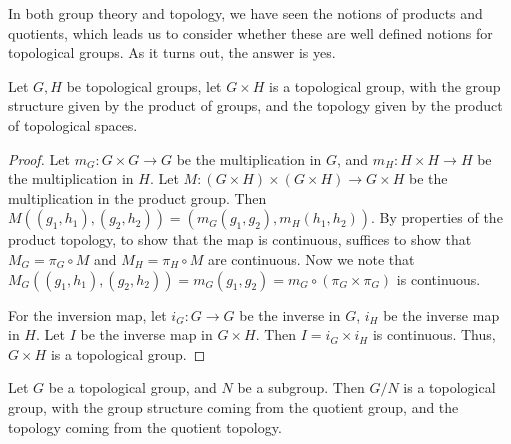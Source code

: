 \documentclass{article}
\begin{document}
    In both group theory and topology, we have seen the notions of products and quotients, which leads us to consider whether these are well defined notions for topological groups. As it turns out, the answer is yes.

    \begin{proposition}
        Let $G, H$ be topological groups, let $G \times H$ is a topological group, with the group structure given by the product of groups, and the topology given by the product of topological spaces.
    \end{proposition}

    \begin{proof}
        Let $m_G : G \times G \to G$ be the multiplication in $G$, and $m_H : H \times H \to H$ be the multiplication in $H$. Let $M : (G \times H) \times (G \times H) \to G \times H$ be the multiplication in the product group. Then $M((g_1, h_1), (g_2, h_2)) = (m_G(g_1, g_2), m_H(h_1, h_2))$. By properties of the product topology, to show that the map is continuous, suffices to show that $M_G = \pi_G \circ M$ and $M_H = \pi_H \circ M$ are continuous. Now we note that $M_G((g_1, h_1), (g_2, h_2)) = m_G(g_1, g_2) = m_G \circ (\pi_G \times \pi_G)$ is continuous.

        For the inversion map, let $i_G : G \to G$ be the inverse in $G$, $i_H$ be the inverse map in $H$. Let $I$ be the inverse map in $G \times H$. Then $I = i_G \times i_H$ is continuous. Thus, $G \times H$ is a topological group.
    \end{proof}

    \begin{proposition}

        Let $G$ be a topological group, and $N$ be a subgroup. Then $G/N$ is a topological group, with the group structure coming from the quotient group, and the topology coming from the quotient topology.
    \end{proposition}
\end{document}
